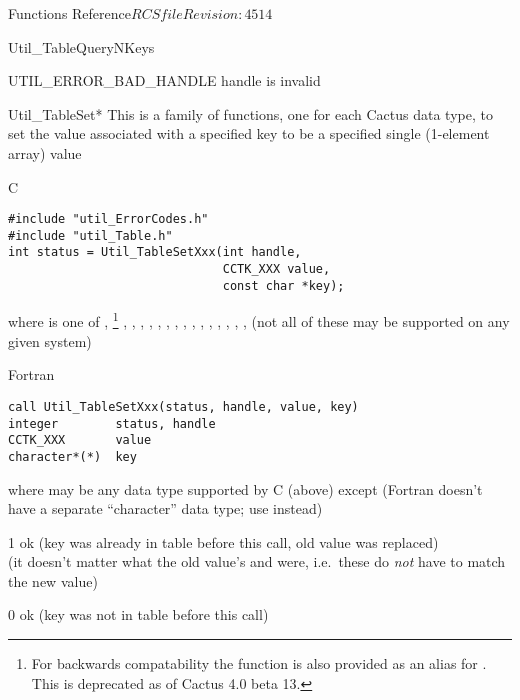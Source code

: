 \begin{cactuspart}{ Functions Reference}{$RCSfile$}{$Revision: 4514 $}
\begin{FunctionDescription}{Util\_TableQueryNKeys}
\begin{ErrorSection}
\begin{Error}{UTIL\_ERROR\_BAD\_HANDLE}
handle is invalid
\end{Error}
\end{ErrorSection}
\end{FunctionDescription}


\begin{FunctionDescription}{Util\_TableSet*}
\label{Util-TableSet*}
This is a family of functions, one for each Cactus data type,
to set the value associated with a specified key to be a specified
single (1-element array) value

\begin{SynopsisSection}
\begin{Synopsis}{C}
\begin{verbatim}
#include "util_ErrorCodes.h"
#include "util_Table.h"
int status = Util_TableSetXxx(int handle,
                              CCTK_XXX value,
                              const char *key);
\end{verbatim}
where  is one of
   , %
\footnote{%
	 For backwards compatability the function
	  is also provided
	 as an alias for .
	 This is deprecated as of Cactus 4.0 beta 13.
	 }%
,
   , ,
   , , , , ,
   , , , ,
   , , , 
(not all of these may be supported on any given system)
\end{Synopsis}
\begin{Synopsis}{Fortran}
\begin{verbatim}
call Util_TableSetXxx(status, handle, value, key)
integer        status, handle
CCTK_XXX       value
character*(*)  key
\end{verbatim}
where  may be any data type supported by C (above)
except  (Fortran doesn't have a separate ``character''
data type; use  instead)
\end{Synopsis}
\end{SynopsisSection}

\begin{ResultSection}
\begin{Result}{\rm 1}
ok (key was already in table before this call, old value was replaced)\\
   (it doesn't matter what the old value's  and
     were, i.e.\ these do {\em not\/} have to match
    the new value)
\end{Result}
\begin{Result}{\rm 0}
ok (key was not in table before this call)
\end{Result}
\end{ResultSection}


\end{FunctionDescription}
\end{cactuspart}
